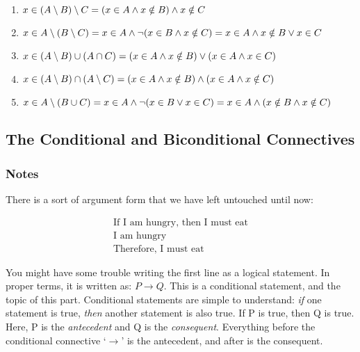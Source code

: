 \documentclass[a4paper, 11pt]{article}
\begin{document}
\begin{enumerate}
\begin{enumerate}
          \item $x \in (A \setminus B) \setminus C \\
                  = (x \in A \wedge x \notin B) \wedge x \notin C$
          \item $x \in A \setminus (B \setminus C) \\
                  = x \in A \wedge \neg (x \in B \wedge x \notin C) \\
                  = x \in A \wedge x \notin B \vee x \in C$
          \item $x \in (A \setminus B) \cup (A \cap C) \\
                  = (x \in A \wedge x \notin B) \vee (x \in A \wedge x \in C)$
          \item $x \in (A \setminus B) \cap (A \setminus C) \\
                  = (x \in A \wedge x \notin B) \wedge (x \in A \wedge x \notin C)$
          \item $x \in A \setminus (B \cup C) \\
                  = x \in A \wedge \neg(x \in B \vee x \in C) \\
                  = x \in A \wedge (x \notin B \wedge x \notin C)$
        \end{enumerate}
\end{enumerate}

\clearpage

\subsection{The Conditional and Biconditional Connectives}
\subsubsection{Notes}
There is a sort of argument form that we have left untouched until now:

\begin{align*}
  \text{If I am hungry, then I must eat} \\
  \text{I am hungry}                     \\
  \text{Therefore, I must eat}
\end{align*}

You might have some trouble writing the first line as a logical statement. In proper terms, it is written as: $P \rightarrow Q$. This is a conditional statement, and the topic of this part. Conditional statements are simple to understand: \textit{if} one statement is true, \textit{then} another statement is also true. If P is true, then Q is true. Here, P is the \textit{antecedent} and Q is the \textit{consequent}. Everything before the conditional connective `$\rightarrow$' is the antecedent, and after is the consequent.
\end{document}
